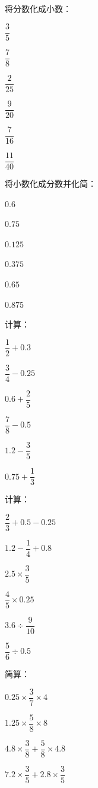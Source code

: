 \documentclass[a4paper,12pt]{ctexart}
\begin{document}
\begin{exercise}
\item 将分数化成小数：
  \begin{subexercise}
    \item $\dfrac{3}{5}$
    \item $\dfrac{7}{8}$
    \item $\dfrac{2}{25}$
    \item $\dfrac{9}{20}$
    \item $\dfrac{7}{16}$
    \item $\dfrac{11}{40}$
  \end{subexercise}

\item 将小数化成分数并化简：
  \begin{subexercise}
    \item $0.6$
    \item $0.75$
    \item $0.125$
    \item $0.375$
    \item $0.65$
    \item $0.875$
  \end{subexercise}

\item 计算：
  \begin{subexercise}
    \item $\dfrac{1}{2}+0.3$
    \item $\dfrac{3}{4}-0.25$
    \item $0.6+\dfrac{2}{5}$
    \item $\dfrac{7}{8}-0.5$
    \item $1.2-\dfrac{3}{5}$
    \item $0.75+\dfrac{1}{3}$
  \end{subexercise}

\item 计算：
  \begin{subexercise}
    \item $\dfrac{2}{3}+0.5-0.25$
    \item $1.2-\dfrac{1}{4}+0.8$
    \item $2.5\times\dfrac{3}{5}$
    \item $\dfrac{4}{5}\times0.25$
    \item $3.6\div\dfrac{9}{10}$
    \item $\dfrac{5}{6}\div0.5$
  \end{subexercise}

\item 简算：
  \begin{subexercise}
    \item $0.25\times\dfrac{3}{7}\times4$
    \item $1.25\times\dfrac{5}{8}\times8$
    \item $4.8\times\dfrac{3}{8}+\dfrac{5}{8}\times4.8$
    \item $7.2\times\dfrac{3}{5}+2.8\times\dfrac{3}{5}$
  \end{subexercise}


\end{exercise}
\end{document}
